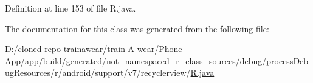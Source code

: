Definition at line 153 of file R.\+java.



The documentation for this class was generated from the following file\+:\begin{DoxyCompactItemize}
\item 
D\+:/cloned repo trainawear/train-\/\+A-\/wear/\+Phone App/app/build/generated/not\+\_\+namespaced\+\_\+r\+\_\+class\+\_\+sources/debug/process\+Debug\+Resources/r/android/support/v7/recyclerview/\mbox{\hyperlink{process_debug_resources_2r_2android_2support_2v7_2recyclerview_2_r_8java}{R.\+java}}\end{DoxyCompactItemize}
